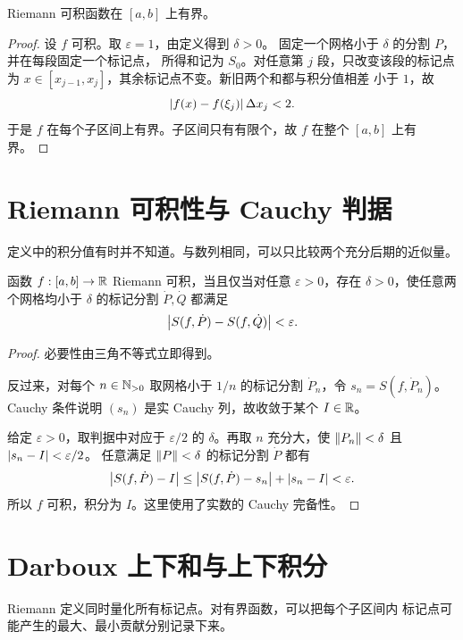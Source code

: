 \begin{proposition}[可积函数必有界]
\label{prop:riemann-integrable-bounded}
Riemann 可积函数在 \([a,b]\) 上有界。
\end{proposition}

\begin{proof}
设 \(f\) 可积。取 \(\varepsilon=1\)，由定义得到 \(\delta>0\)。
固定一个网格小于 \(\delta\) 的分割 \(P\)，并在每段固定一个标记点，
所得和记为 \(S_0\)。对任意第 \(j\) 段，只改变该段的标记点为
\(x\in[x_{j-1},x_j]\)，其余标记点不变。新旧两个和都与积分值相差
小于 \(1\)，故
\[
 \left|f(x)-f(\xi_j)\right|\Delta x_j<2.
\]
于是 \(f\) 在每个子区间上有界。子区间只有有限个，故 \(f\) 在整个
\([a,b]\) 上有界。
\end{proof}

\section{Riemann 可积性与 Cauchy 判据}

定义中的积分值有时并不知道。与数列相同，可以只比较两个充分后期的近似量。

\begin{theorem}
\label{thm:riemann-cauchy}
函数 \(f:[a,b]\to\mathbb{R}\) Riemann 可积，当且仅当对任意
\(\varepsilon>0\)，存在 \(\delta>0\)，使任意两个网格均小于
\(\delta\) 的标记分割 \(\dot P,\dot Q\) 都满足
\[
 \left|S(f,\dot P)-S(f,\dot Q)\right|<\varepsilon.
\]
\end{theorem}

\begin{proof}
必要性由三角不等式立即得到。

反过来，对每个 \(n\in\mathbb{N}_{>0}\) 取网格小于 \(1/n\) 的标记分割
\(\dot P_n\)，令 \(s_n=S(f,\dot P_n)\)。Cauchy 条件说明
\((s_n)\) 是实 Cauchy 列，故收敛于某个 \(I\in\mathbb{R}\)。

给定 \(\varepsilon>0\)，取判据中对应于 \(\varepsilon/2\) 的
\(\delta\)。再取 \(n\) 充分大，使
\(\left\lVert P_n\right\rVert<\delta\) 且 \(\left|s_n-I\right|<\varepsilon/2\)。
任意满足 \(\left\lVert P\right\rVert<\delta\) 的标记分割 \(\dot P\) 都有
\[
 \left|S(f,\dot P)-I\right|
 \le \left|S(f,\dot P)-s_n\right|+\left|s_n-I\right|
 <\varepsilon.
\]
所以 \(f\) 可积，积分为 \(I\)。这里使用了实数的 Cauchy 完备性。
\end{proof}

\section{Darboux 上下和与上下积分}

Riemann 定义同时量化所有标记点。对有界函数，可以把每个子区间内
标记点可能产生的最大、最小贡献分别记录下来。

